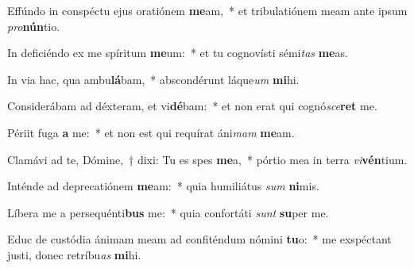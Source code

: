 \item Effúndo in conspéctu ejus oratiónem \textbf{me}am,~* et tribulatiónem meam ante ipsum \textit{pro}\textbf{nún}tio.
\item In deficiéndo ex me spíritum \textbf{me}um:~* et tu cognovísti sémi\textit{tas} \textbf{me}as.
\item In via hac, qua ambu\textbf{lá}bam,~* abscondérunt láque\textit{um} \textbf{mi}hi.
\item Considerábam ad déxteram, et vi\textbf{dé}bam:~* et non erat qui cognó\textit{sce}\textbf{ret} me.
\item Périit fuga \textbf{a} me:~* et non est qui requírat áni\textit{mam} \textbf{me}am.
\item Clamávi ad te, Dómine,~† dixi: Tu es spes \textbf{me}a,~* pórtio mea in terra \textit{vi}\textbf{vén}tium.
\item Inténde ad deprecatiónem \textbf{me}am:~* quia humiliátus \textit{sum} \textbf{ni}mis.
\item Líbera me a persequénti\textbf{bus} me:~* quia confortáti \textit{sunt} \textbf{su}per me.
\item Educ de custódia ánimam meam ad confiténdum nómini \textbf{tu}o:~* me exspéctant justi, donec retríbu\textit{as} \textbf{mi}hi.
